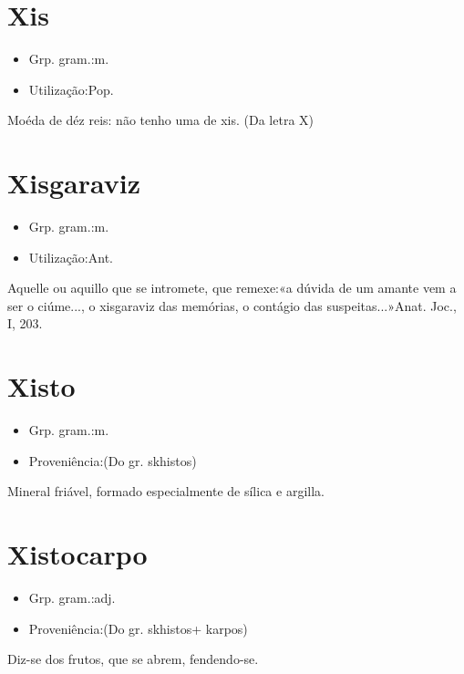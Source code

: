 \section{Xis}
\begin{itemize}
\item {Grp. gram.:m.}
\end{itemize}
\begin{itemize}
\item {Utilização:Pop.}
\end{itemize}
Moéda de déz reis: \textunderscore não tenho uma de xis\textunderscore .
(Da letra \textunderscore X\textunderscore )
\section{Xisgaraviz}
\begin{itemize}
\item {Grp. gram.:m.}
\end{itemize}
\begin{itemize}
\item {Utilização:Ant.}
\end{itemize}
Aquelle ou aquillo que se intromete, que remexe:«\textunderscore a dúvida de um amante vem a ser o ciúme..., o xisgaraviz das memórias, o contágio das suspeitas...\textunderscore »\textunderscore Anat. Joc.\textunderscore , I, 203.
\section{Xisto}
\begin{itemize}
\item {Grp. gram.:m.}
\end{itemize}
\begin{itemize}
\item {Proveniência:(Do gr. \textunderscore skhistos\textunderscore )}
\end{itemize}
Mineral friável, formado especialmente de sílica e argilla.
\section{Xistocarpo}
\begin{itemize}
\item {Grp. gram.:adj.}
\end{itemize}
\begin{itemize}
\item {Proveniência:(Do gr. \textunderscore skhistos\textunderscore  + \textunderscore karpos\textunderscore )}
\end{itemize}
Diz-se dos frutos, que se abrem, fendendo-se.
